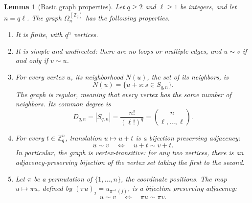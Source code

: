 \documentclass[11pt,a4paper]{article}
\numberwithin{equation}{section}
\numberwithin{figure}{section}
\numberwithin{table}{section}
\numberwithin{footnote}{section}
\newtheorem{lemma}[theorem]{Lemma}
\theoremstyle{informal}\newtheorem*{informaltheorem}{Informal theorem}
\theoremstyle{definition}\newtheorem{example}{Example}[section]
\theoremstyle{remark}\newtheorem{remark}[theorem]{Remark}
\newcommand{\Z}{\mathbb Z}
\newcommand{\Om}{\Omega_n^{(\Z_q)}}
\newcommand{\mult}[2]{\binom{#1}{#2}}
\begin{document}
\begin{lemma}[Basic graph properties]\label{lem:graph-properties}
Let \(q\geq2\) and \(\ell\geq1\) be integers, and let \(n=q\ell\).
The graph \(\Om\) has the following properties.
\begin{enumerate}[label=\textup{(\roman*)},leftmargin=*,itemsep=4pt]
\item\label{item:graph-size}
It is finite, with \(q^n\) vertices.

\item\label{item:graph-simple}
It is simple and undirected: there are no loops or multiple edges,
and \(u\sim v\) if and only if \(v\sim u\).

\item\label{item:graph-degree}
For every vertex \(u\), its neighborhood \(N(u)\), the set of its
neighbors, is
\begin{equation}
 N(u)=\{u+s:s\in S_{q,n}\}.
\end{equation}
The graph is regular, meaning that every vertex has the same number
of neighbors. Its common degree is
\begin{equation}\label{eq:degree}
 D_{q,n}=|S_{q,n}|=\frac{n!}{(\ell!)^q}
                  =\mult{n}{\ell,\ldots,\ell}.
\end{equation}

\item\label{item:graph-translations}
For every \(t\in\Z_q^n\), translation \(u\mapsto u+t\) is a
bijection preserving adjacency:
\begin{equation}
 u\sim v\quad\Longleftrightarrow\quad u+t\sim v+t.
\end{equation}
In particular, the graph is \emph{vertex-transitive}: for any two
vertices, there is an adjacency-preserving bijection of the vertex
set taking the first to the second.

\item\label{item:graph-coordinates}
Let \(\pi\) be a permutation of \(\{1,\ldots,n\}\), the coordinate
positions. The map \(u\mapsto\pi u\), defined by
\((\pi u)_j=u_{\pi^{-1}(j)}\), is a bijection preserving adjacency:
\begin{equation}
 u\sim v\quad\Longleftrightarrow\quad\pi u\sim\pi v.
\end{equation}
\end{enumerate}
\end{lemma}
\end{document}
